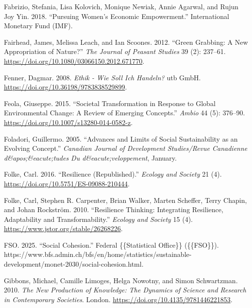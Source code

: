 \documentclass[
  a4paper,
  openany]{book}
\newlength{\cslhangindent}
\newenvironment{CSLReferences}[2] %
 {\begin{list}{}{%
  \setlength{\itemindent}{0pt}
  \setlength{\leftmargin}{0pt}
  \setlength{\parsep}{0pt}
  \ifodd #1
   \setlength{\leftmargin}{\cslhangindent}
   \setlength{\itemindent}{-1\cslhangindent}
  \fi
  \setlength{\itemsep}{#2\baselineskip}}}
 {\end{list}}
\begin{document}
\begin{CSLReferences}{1}{0}
Fabrizio, Stefania, Lisa Kolovich, Monique Newiak, Annie Agarwal, and
Rujun Joy Yin. 2018. {``Pursuing {Women}'s {Economic Empowerment}.''}
International Monetary Fund (IMF).

Fairhead, James, Melissa Leach, and Ian Scoones. 2012. {``Green
{Grabbing}: A New Appropriation of Nature?''} \emph{The Journal of
Peasant Studies} 39 (2): 237--61.
\url{https://doi.org/10.1080/03066150.2012.671770}.

Fenner, Dagmar. 2008. \emph{Ethik - {Wie} Soll Ich Handeln?} utb GmbH.
\url{https://doi.org/10.36198/9783838529899}.

Feola, Giuseppe. 2015. {``Societal Transformation in Response to Global
Environmental Change: {A} Review of Emerging Concepts.''} \emph{Ambio}
44 (5): 376--90. \url{https://doi.org/10.1007/s13280-014-0582-z}.

Foladori, Guillermo. 2005. {``Advances and {Limits} of {Social
Sustainability} as an {Evolving Concept}.''} \emph{Canadian Journal of
Development Studies/Revue Canadienne d\&apos;\&eacute;tudes Du
d\&eacute;veloppement}, January.

Folke, Carl. 2016. {``Resilience ({Republished}).''} \emph{Ecology and
Society} 21 (4). \url{https://doi.org/10.5751/ES-09088-210444}.

Folke, Carl, Stephen R. Carpenter, Brian Walker, Marten Scheffer, Terry
Chapin, and Johan Rockström. 2010. {``Resilience {Thinking}:
{Integrating} {Resilience}, {Adaptability} and {Transformability}.''}
\emph{Ecology and Society} 15 (4).
\url{https://www.jstor.org/stable/26268226}.

FSO. 2025. {``Social Cohesion.''} Federal \{\{Statistical Office\}\}
(\{\{FSO\}\}).
https://www.bfs.admin.ch/bfs/en/home/statistics/sustainable-development/monet-2030/social-cohesion.html.

Gibbons, Michael, Camille Limoges, Helga Nowotny, and Simon Schwartzman.
2010. \emph{The {New} {Production} of {Knowledge}: {The} {Dynamics} of
{Science} and {Research} in {Contemporary} {Societies}}. London.
\url{https://doi.org/10.4135/9781446221853}.


\end{CSLReferences}
\end{document}
